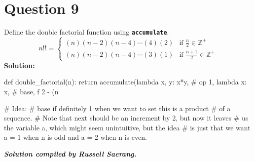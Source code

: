 \section{Question 9}
Define the double factorial function using \texttt{\bfseries accumulate}.
\[
    n!! =
    \begin{cases}
        (n)(n-2)(n-4)\cdots(4)(2) & \text{if } \frac{n}{2} \in \mathbb{Z^+} \\
        (n)(n-2)(n-4)\cdots(3)(1) & \text{if } \frac{n+1}{2} \in \mathbb{Z^+}
    \end{cases}    
\]
\textbf{Solution:}
\begin{python}
def double_factorial(n):
    return accumulate(lambda x, y: x*y,                 # op
                      1, lambda x: x,                   # base, f
                      2 - (n %

# Idea:
# base if definitely 1 when we want to set this is a product
# of a sequence.
# Note that next should be an increment by 2, but now it leaves
# us the variable a, which might seem unintuitive, but the idea
# is just that we want a = 1 when n is odd and a = 2 when n is even.
\end{python}

\begin{flushright}
\vspace{2 cm}\textbf{\textit{Solution compiled by Russell Saerang.}}
\end{flushright}
